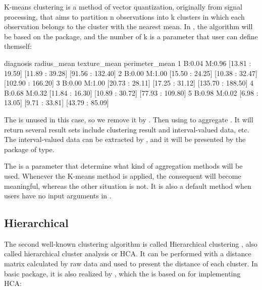 \documentclass[article]{jss}
\begin{document}
K-means clustering is a method of vector quantization, originally from signal processing, that aims to partition n observations into k clusters in which each observation belongs to the cluster with the nearest mean. In , the algorithm will be based on the  package, and the number of k is a parameter that user can define themself:

\begin{Schunk}
\begin{Soutput}
      diagnosis     radius_mean    texture_mean    perimeter_mean
1 B:0.04 M:0.96 [13.81 : 19.59] [11.89 : 39.28]  [91.56 : 132.40]
2 B:0.00 M:1.00 [15.50 : 24.25] [10.38 : 32.47] [102.90 : 166.20]
3 B:0.00 M:1.00 [20.73 : 28.11] [17.25 : 31.12] [135.70 : 188.50]
4 B:0.68 M:0.32 [11.84 : 16.30] [10.89 : 30.72]  [77.93 : 109.80]
5 B:0.98 M:0.02  [6.98 : 13.05]  [9.71 : 33.81]   [43.79 : 85.09]
\end{Soutput}
\end{Schunk}

The  is unused in this case, so we remove it by . Then using  to aggregate . It will return several result sets include clustering result and interval-valued data, etc. The interval-valued data can be extracted by , and it will be presented by the package of  type.

The  is a parameter that determine what kind of aggregation methods will be used. Whenever the K-means method is applied, the consequent  will become meaningful, whereas the other situation is not. It is also a default method when users have no input arguments in .

\subsection{Hierarchical}

The second well-known clustering algorithm is called Hierarchical clustering \cite{Cecil:1966}, also called hierarchical cluster analysis or HCA. It can be performed with a distance matrix
calculated by raw data and used to present the distance of each cluster. In basic  package, it is also realized by , which the  is based on for implementing HCA:
\end{document}
